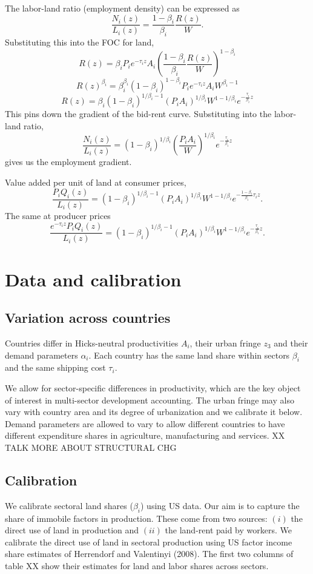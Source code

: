 \documentclass[12pt]{article}
\begin{document}
The labor-land ratio (employment density) can be expressed as
\[
\frac{N_i(z)}{L_i(z)} = \frac{1-\beta_i}{\beta_i}\frac{R(z)}{W}.
\]
Substituting this into the FOC for land,
\[
R(z) =\beta_i P_ie^{-\tau_i z}A_i \left(\frac{1-\beta_i}{\beta_i}\frac{R(z)}{W}\right)^{1-\beta_i}
\]
\[
R(z)^{\beta_i} =\beta_i^{\beta_i}(1-\beta_i)^{1-\beta_i} P_ie^{-\tau_i z}A_i W^{\beta_i-1}
\]
\[
R(z) =\beta_i(1-\beta_i)^{1/\beta_i-1} (P_iA_i)^{1/\beta_i} W^{1-1/\beta_i} e^{-\frac{\tau_i}{\beta_i} z}
\]
This pins down the gradient of the bid-rent curve. Substituting into the labor-land ratio,
\[
\frac{N_i(z)}{L_i(z)} = (1-\beta_i)^{1/\beta_i} \left(\frac{P_iA_i}{W}\right)^{1/\beta_i} e^{-\frac{\tau_i}{\beta_i} z}
\]
gives us the employment gradient.

Value added per unit of land at consumer prices,
\[
\frac{P_i Q_i(z)}{L_i(z)} = (1-\beta_i)^{1/\beta_i-1}
(P_iA_i)^{1/\beta_i}W^{1-1/\beta_i}
 e^{-\frac{1-\beta_i}{\beta_i}\tau_i z}.
\]
The same at producer prices
\[
\frac{e^{-\tau_i z} P_i Q_i(z)}{L_i(z)} = (1-\beta_i)^{1/\beta_i-1}
(P_iA_i)^{1/\beta_i}W^{1-1/\beta_i}
 e^{-\frac{\tau_i}{\beta_i} z}.
\]


\section{Data and calibration}

\subsection{Variation across countries}
Countries differ in Hicks-neutral productivities $A_i$, their urban fringe $z_3$ and their demand parameters $\alpha_i$. Each country has the same land share within sectors $\beta_i$ and the same shipping cost $\tau_i$.

We allow for sector-specific differences in productivity, which are the key object of interest in multi-sector development accounting. The urban fringe may also vary with country area and its degree of urbanization and we calibrate it below. Demand parameters are allowed to vary to allow different countries to have different expenditure shares in agriculture, manufacturing and services. XX TALK MORE ABOUT STRUCTURAL CHG

\subsection{Calibration}

We calibrate sectoral land shares ($\beta_i$) using US data. Our aim is to capture the share of immobile factors in production. These come from two sources: $(i)$ the direct use of land in production and $(ii)$ the land-rent paid by workers. We calibrate the direct use of land in sectoral production using US factor income share estimates of Herrendorf and Valentinyi (2008). The first two columns of table XX show their estimates for land and labor shares across sectors.
\end{document}

